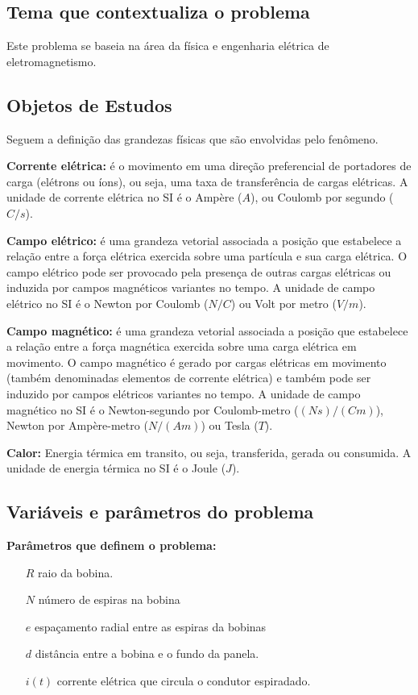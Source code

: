 \documentclass[
	article,			%
	11pt,				%
	oneside,			%
	a4paper,			%
	english,			%
	brazil,				%
	sumario=tradicional
	]{abntex2}
\begin{document}
\subsection{Tema que contextualiza o problema}

Este problema se baseia na área da física e engenharia elétrica de eletromagnetismo.

\subsection{Objetos de Estudos}

Seguem a definição das grandezas físicas que são envolvidas pelo fenômeno.

\textbf{Corrente elétrica:} é o movimento em uma direção preferencial de portadores de carga (elétrons ou íons), ou seja, uma taxa de transferência de cargas elétricas. A unidade de corrente elétrica no SI é o Ampère ($ A $), ou Coulomb por segundo ($ C/s $). \cite{keller:1998}

\textbf{Campo elétrico:} é uma grandeza vetorial associada a posição que estabelece a relação entre a força elétrica exercida sobre uma partícula e sua carga elétrica. O campo elétrico pode ser provocado pela presença de outras cargas elétricas ou induzida por campos magnéticos variantes no tempo. A unidade de campo elétrico no SI é o Newton por Coulomb ($ N/C $) ou Volt por metro ($ V/m $). \cite{keller:1998}

\textbf{Campo magnético:} é uma grandeza vetorial associada a posição que estabelece a relação entre a força magnética exercida sobre uma carga elétrica em movimento. O campo magnético é gerado por cargas elétricas em movimento (também denominadas elementos de corrente elétrica) e também pode ser induzido por campos elétricos variantes no tempo. A unidade de campo magnético no SI é o Newton-segundo por Coulomb-metro ($ (Ns)/(Cm) $), Newton por Ampère-metro ($ N/(Am) $) ou Tesla ($ T $). \cite{keller:1998}

\textbf{Calor:} Energia térmica em transito, ou seja, transferida, gerada ou consumida. A unidade de energia térmica no SI é o Joule ($ J $).

\subsection{Variáveis e parâmetros do problema}

\textbf{Parâmetros que definem o problema:}

\begin{itemize}
	\item[$ R $] raio da bobina.
	\item[$ N $] número de espiras na bobina
	\item[$ e $] espaçamento radial entre as espiras da bobinas
	\item[$ d $] distância entre a bobina e o fundo da panela.
	\item[$ i(t) $] corrente elétrica que circula o condutor espiradado.
\end{itemize}
\end{document}
